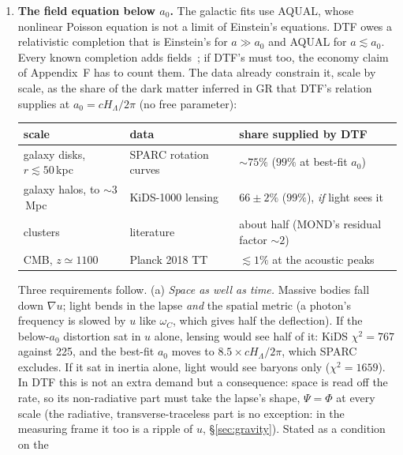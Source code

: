 \documentclass[11pt]{article}
\begin{document}
\begin{enumerate}[leftmargin=1.9em,itemsep=2pt,topsep=2pt,label=\textbf{O\arabic*.}]
does not. Casting $u$ as a relational observable~\cite{Rovelli2002,Dittrich2006} would settle whether the
choice is physics or gauge; until then ``nothing added'' is established only where matter fixes $n^\mu$. (\texttt{DTF\_o6\_congruence.py} verifies the covariant form for a given congruence; it does not
fix the choice.)
\item \textbf{The field equation below $a_0$.} The galactic fits use AQUAL, whose nonlinear Poisson equation is
not a limit of Einstein's equations. DTF owes a relativistic completion that is Einstein's for $a\gg a_0$ and AQUAL
for $a\lesssim a_0$. Every known completion adds fields~\cite{Bekenstein2004,SkordisZlosnik2021}; if DTF's must too,
the economy claim of Appendix~F has to count them. The data already constrain it, scale by scale, as the share
of the dark matter inferred in GR that DTF's relation supplies at $a_0=cH_\Lambda/2\pi$ (no free parameter):
\begin{center}\small
\begin{tabular}{@{}lll@{}}
\toprule
scale & data & share supplied by DTF\\\midrule
galaxy disks, $r\lesssim50$\,kpc & SPARC rotation curves~\cite{Lelli2016} & $\sim\!75\%$ ($99\%$ at best-fit $a_0$)\\
galaxy halos, to $\sim3$\,Mpc & KiDS-1000 lensing~\cite{Brouwer2021} & $66\pm2\%$ ($99\%$), \emph{if} light sees it\\
clusters & literature~\cite{Sanders2003,PointecouteauSilk2005} & about half (MOND's residual factor $\sim2$)\\
CMB, $z\simeq1100$ & Planck 2018 TT~\cite{Planck2018} & $\lesssim1\%$ at the acoustic peaks\\
\bottomrule
\end{tabular}
\end{center}
Three requirements follow. (a) \emph{Space as well as time.} Massive bodies fall down $\nabla u$; light bends in
the lapse \emph{and} the spatial metric (a photon's frequency is slowed by $u$ like $\omega_C$, which gives half the
deflection). If the below-$a_0$ distortion sat in $u$ alone, lensing would see half of it: KiDS $\chi^2=767$ against
225, and the best-fit $a_0$ moves to $8.5\times cH_\Lambda/2\pi$, which SPARC excludes. If it sat in inertia alone,
light would see baryons only ($\chi^2=1659$). In DTF this is not an extra demand but a consequence: space is read off
the rate, so its non-radiative part must take the lapse's shape, $\Psi=\Phi$ at every scale (the radiative,
transverse-traceless part is no exception: in the measuring frame it too is a ripple of $u$, \S\ref{sec:gravity}). Stated as a condition on the

\end{enumerate}
\end{document}
